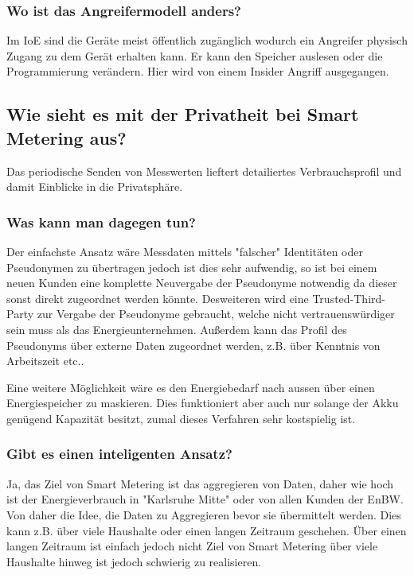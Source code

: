 	\subsubsection{Wo ist das Angreifermodell anders?}
	Im IoE sind die Geräte meist öffentlich zugänglich wodurch ein Angreifer physisch Zugang zu dem Gerät erhalten kann. Er kann den Speicher auslesen oder die Programmierung verändern.
	Hier wird von einem Insider Angriff ausgegangen.
	
	\subsection{Wie sieht es mit der Privatheit bei Smart\- Metering aus?}
	Das periodische Senden von Messwerten lieftert detailiertes Verbrauchsprofil und damit Einblicke in die Privatsphäre.
	
	\subsubsection{Was kann man dagegen tun?}
	Der einfachste Ansatz wäre Messdaten mittels "falscher" Identitäten oder Pseudonymen zu übertragen jedoch ist dies sehr aufwendig, so ist bei einem neuen Kunden eine komplette Neuvergabe der Pseudonyme notwendig da dieser sonst direkt zugeordnet werden könnte. Desweiteren wird eine Trusted-Third-Party zur Vergabe der Pseudonyme gebraucht, welche nicht vertrauenswürdiger sein muss als das Energieunternehmen.
	Außerdem kann das Profil des Pseudonyms über externe Daten zugeordnet werden, z.B. über Kenntnis von Arbeitszeit etc..
	
	Eine weitere Möglichkeit wäre es den Energiebedarf nach aussen über einen Energiespeicher zu maskieren. Dies funktioniert aber auch nur solange der Akku genügend Kapazität besitzt, zumal dieses Verfahren sehr kostspielig ist.

\subsubsection{Gibt es einen inteligenten Ansatz?}
	Ja, das Ziel von Smart\- Metering ist das aggregieren von Daten, daher wie hoch ist der Energieverbrauch in "Karlsruhe\- Mitte" oder von allen Kunden der EnBW. Von daher die Idee, die Daten zu Aggregieren bevor sie übermittelt werden. Dies kann z.B. über viele Haushalte oder einen langen Zeitraum geschehen. 
	Über einen langen Zeitraum ist einfach jedoch nicht Ziel von Smart\- Metering über viele Haushalte hinweg ist jedoch schwierig zu realisieren.
